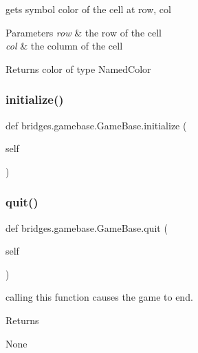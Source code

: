 gets symbol color of the cell at row, col 


\begin{DoxyParams}{Parameters}
{\em row} & the row of the cell \\
\hline
{\em col} & the column of the cell\\
\hline
\end{DoxyParams}
\begin{DoxyReturn}{Returns}
color of type Named\+Color 
\end{DoxyReturn}
\mbox{\label{classbridges_1_1gamebase_1_1_game_base_a336629d190f1601f1211ca57e4d5427d}} 
\subsubsection{\texorpdfstring{initialize()}{initialize()}}
{\footnotesize\ttfamily def bridges.\+gamebase.\+Game\+Base.\+initialize (\begin{DoxyParamCaption}\item[{}]{self }\end{DoxyParamCaption})}

\mbox{\label{classbridges_1_1gamebase_1_1_game_base_a21742d4e630fa64dc76848c7b4fcb344}} 
\subsubsection{\texorpdfstring{quit()}{quit()}}
{\footnotesize\ttfamily def bridges.\+gamebase.\+Game\+Base.\+quit (\begin{DoxyParamCaption}\item[{}]{self }\end{DoxyParamCaption})}



calling this function causes the game to end. 

\begin{DoxyReturn}{Returns}


None 
\end{DoxyReturn}
\mbox{\label{classbridges_1_1gamebase_1_1_game_base_ac60243e192a502fb7be51f86eb5b76b6}} 
